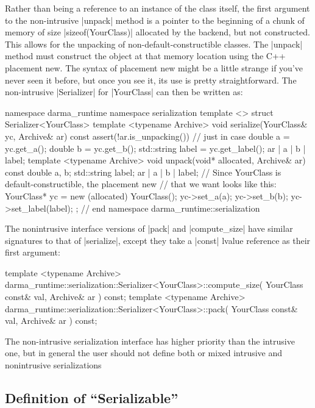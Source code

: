 Rather than being a reference to an instance of the class itself, the first
argument to the non-intrusive |unpack| method is a pointer to the beginning of a
chunk of memory of size |sizeof(YourClass)| allocated by the backend, but not
constructed.  This allows for the unpacking of non-default-constructible
classes.  The |unpack| method must construct the object at that memory
location using the C++ placement new.  The syntax of placement new might be a
little strange if you've never seen it before, but once you see it, its use is
pretty straightforward.  The non-intrusive |Serializer| for |YourClass| can then
be written as:
\begin{CppCodeNumb}
namespace darma_runtime { namespace serialization {
template <>
struct Serializer<YourClass> {
  template <typename Archive>
  void serialize(YourClass& yc, Archive& ar) const {
    assert(!ar.is_unpacking()) // just in case
    double a = yc.get_a();
    double b = yc.get_b();
    std::string label = yc.get_label();
    ar | a | b | label;
  }
  template <typename Archive>
  void unpack(void* allocated, Archive& ar) const {
    double a, b;
    std::string label;
    ar | a | b | label;
    // Since YourClass is default-constructible, the placement new
    // that we want looks like this:
    YourClass* yc = new (allocated) YourClass();
    yc->set_a(a);
    yc->set_b(b);
    yc->set_label(label);
  }
};
}} // end namespace darma_runtime::serialization
\end{CppCodeNumb}
The nonintrusive interface versions of |pack| and |compute_size| have similar
signatures to that of |serialize|, except they take a |const| lvalue reference
as their first argument:
\begin{CppCodeNumb}
template <typename Archive>
darma_runtime::serialization::Serializer<YourClass>::compute_size(
  YourClass const& val, Archive& ar
) const;
template <typename Archive>
darma_runtime::serialization::Serializer<YourClass>::pack(
  YourClass const& val, Archive& ar
) const;
\end{CppCodeNumb}

The non-intrusive serialization interface has higher priority than the intrusive
one, but in general the user should not define both or mixed intrusive and
nonintrusive serializations

\subsection{Definition of ``Serializable''}

